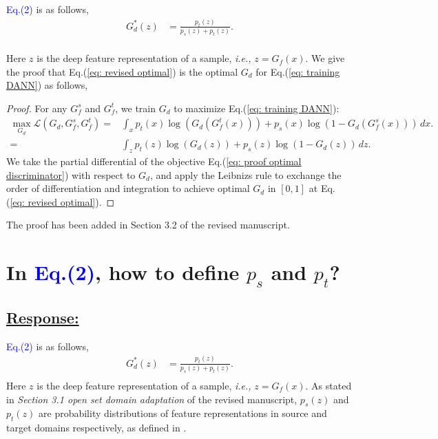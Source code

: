 {\textcolor{blue}{Eq.(2)} is as follows,
\begin{equation}
    \label{eq: revised optimal}
    \begin{split}
        G_d^*(z) &= \frac{p_t(z)}{p_s(z)+p_t(z)}. \\
    \end{split}
\end{equation}

Here $z$ is the deep feature representation of a sample, \textit{i.e.,} $z=G_f(x)$.
We give the proof that Eq.(\ref{eq: revised optimal}) is the optimal $G_d$ for Eq.(\ref{eq: training DANN}) as follows,
\begin{proof}
    For any $G_f^s$ and $G_f^t$, we train $G_d$ to maximize Eq.(\ref{eq: training DANN}):
    \begin{equation}
        \label{eq: proof optimal discriminator}
        \begin{split}
            \max_{G_d} \mathscr{L}(G_d,G^{s}_{f},G_f^t)  = &\int_x p_t(x)\log \left(G_d\left(G_f^t\left(x\right)\right)\right)
              + p_s(x) \log\left(1-G_d\left(G_f^s\left(x\right)\right)\right) \, dx.
            \\ = &\int_z p_t(z)\log \left(G_d\left(z\right)\right)
              + p_s(z) \log\left(1-G_d\left(z\right)\right) \, dz.
        \end{split}
    \end{equation}
    We take the partial differential of the objective Eq.(\ref{eq: proof optimal discriminator}) with respect to $G_d$, and apply the Leibnizs rule to exchange the order of differentiation and integration to achieve optimal $G_d$ in $[0, 1]$ at Eq.(\ref{eq: revised optimal}).
\end{proof}

The proof has been added in Section 3.2 of the revised manuscript.

\section{In \textcolor{blue}{Eq.(2)}, how to define $p_s$ and $p_t$?}
\subsection*{\underline{\textbf{Response:}}}

\textcolor{blue}{Eq.(2)} is as follows,
\begin{equation}
    \label{eq: revised optimal 1}
    \begin{split}
        G_d^*(z) &= \frac{p_t(z)}{p_s(z)+p_t(z)}. \\
    \end{split}
\end{equation}
Here $z$ is the deep feature representation of a sample, \textit{i.e.,} $z=G_f(x)$.
As stated in \textit{Section 3.1 open set domain adaptation} of the revised manuscript, $p_s (z)$ and $p_t (z)$ are probability distributions of feature representations in source and target domains respectively, as defined in \cite{PartialDA-iw}.


}
